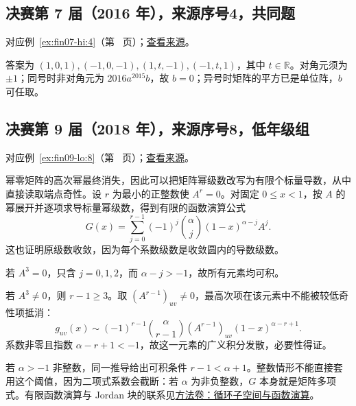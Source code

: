 \documentclass[UTF8,12pt,a4paper,fontset=fandol]{ctexart}
\begin{document}
\subsection{决赛第 7 届（2016 年），来源序号4，共同题}\label{ans:fin07-hi:4}\label{pr:fin07-hi:4}

对应例~\ref{ex:fin07-hi:4}（第~\pageref{ex:fin07-hi:4} 页）；\href{https://github.com/lzxcr/cmc-mathematics/blob/64916fa1fdbc3e444a652eca204d5669058ee321/src/problems/finals/07/04.md}{查看来源}。

\begin{solve}

答案为 $(1,0,1),(-1,0,-1),(1,t,-1),(-1,t,1)$，其中 $t\in\mathbb R$。对角元须为 $\pm1$；同号时非对角元为 $2016a^{2015}b$，故 $b=0$；异号时矩阵的平方已是单位阵，$b$ 可任取。

\end{solve}

\subsection{决赛第 9 届（2018 年），来源序号8，低年级组}\label{ans:fin09-lo:8}\label{pr:fin09-lo:8}

对应例~\ref{ex:fin09-lo:8}（第~\pageref{ex:fin09-lo:8} 页）；\href{https://github.com/lzxcr/cmc-mathematics/blob/64916fa1fdbc3e444a652eca204d5669058ee321/src/problems/finals/09/08.md}{查看来源}。

\begin{solve}

幂零矩阵的高次幂最终消失，因此可以把矩阵幂级数改写为有限个标量导数，从中直接读取端点奇性。设 $r$ 为最小的正整数使 $A^r=0$。对固定 $0\leq x<1$，按 $A$ 的幂展开并逐项求导标量幂级数，得到有限的函数演算公式
\[
G(x)=\sum_{j=0}^{r-1}(-1)^j\binom\alpha j(1-x)^{\alpha-j}A^j.
\]
这也证明原级数收敛，因为每个系数级数是收敛圆内的导数级数。

若 $A^3=0$，只含 $j=0,1,2$，而 $\alpha-j>-1$，故所有元素均可积。

若 $A^3\ne0$，则 $r-1\geq3$。取 $(A^{r-1})_{uv}\ne0$，最高次项在该元素中不能被较低奇性项抵消：
\[
g_{uv}(x)\sim(-1)^{r-1}\binom\alpha{r-1}(A^{r-1})_{uv}(1-x)^{\alpha-r+1}.
\]
系数非零且指数 $\alpha-r+1<-1$，故这一元素的广义积分发散，必要性得证。

\end{solve}

\begin{remark}[方法与条件]

若 $\alpha>-1$ 非整数，同一推导给出可积条件 $r-1<\alpha+1$。整数情形不能直接套用这个阈值，因为二项式系数会截断：若 $\alpha$ 为非负整数，$G$ 本身就是矩阵多项式。有限函数演算与 Jordan 块的联系见\hyperref[app:linear-cyclic]{方法卷：循环子空间与函数演算}。

\end{remark}
\end{document}
